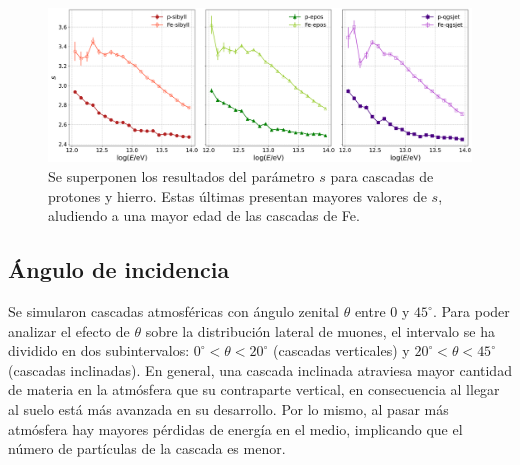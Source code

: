 		\begin{figure} [h]
		\includegraphics[width=\textwidth]{Figuras/composition_nkgs}
		\caption{Se superponen los resultados del par\'ametro $s$ para cascadas de protones y hierro. Estas \'ultimas presentan mayores valores de $s$, aludiendo a una mayor edad de las cascadas de Fe.}
		\label{fig:composition_nkgs}
		\end{figure}	
	
	\subsection{\'Angulo de incidencia}
	Se simularon cascadas atmosf\'ericas con \'angulo zenital $\theta$ entre $0$ y $45^{\circ}$. Para poder analizar el efecto de $\theta$ sobre la distribuci\'on lateral de muones, el intervalo se ha dividido en dos subintervalos: $0^{\circ}<\theta<20^{\circ}$ (cascadas verticales) y $20^{\circ}<\theta<45^{\circ}$ (cascadas inclinadas). En general, una cascada inclinada atraviesa mayor cantidad de materia en la atm\'osfera que su contraparte vertical, en consecuencia al llegar al suelo est\'a m\'as avanzada en su desarrollo. Por lo mismo, al pasar m\'as atm\'osfera hay mayores p\'erdidas de energ\'ia en el medio, implicando que el n\'umero de part\'iculas de la cascada es menor. \\
	
